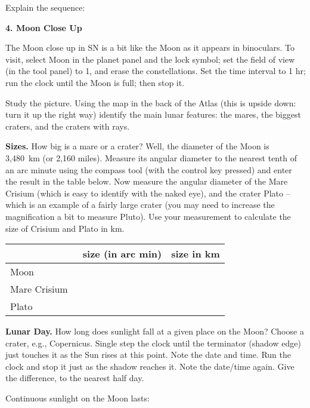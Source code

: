 \documentclass[12pt]{article}
\begin{document}
Explain the sequence: \makebox[12cm]{\hrulefill}

\bigskip
\bigskip
\noindent
{\bf 4. Moon Close Up} 

\medskip
\noindent
The Moon close up in SN is a bit like the Moon as it appears in
binoculars. To visit, select Moon in the planet panel and the lock
symbol; set the field of view (in the tool panel) to 1\deg, and erase
the constellations. Set the time interval to 1 hr;  run the clock
until the Moon is full; then stop it.

Study the picture. Using the map in the back of the Atlas (this
is upside down: turn it up the right way) identify the main lunar
features: the mares, the biggest craters, and the craters with rays.

\medskip
\noindent
{\bf Sizes.}
How big is a mare or a crater? Well, the diameter of the Moon is
3,480~km (or 2,160 miles). Measure its angular diameter to the nearest
tenth of an arc minute using the compass tool (with the control key
pressed) and enter the result in the table below. Now measure the
angular diameter of the Mare Crisium (which is easy to identify with
the naked eye), and the crater Plato -- which is an example of a
fairly large crater (you may need to increase the magnification a bit
to measure Pluto). Use your measurement to calculate the size of
Crisium and Plato in km.



\bigskip
\begin{center}
\begin{tabular}{lcc} \hline
     & \  size (in arc min) &\hspace{1.5cm} size in km  \\
 \hline
Moon           &  &       \\ \hline
Mare Crisium   &  &       \\ \hline
Plato          &  &       \\ \hline
\end{tabular}
\end{center}

\medskip
\noindent
{\bf Lunar Day.} How long does sunlight fall at a given place on the
Moon? Choose a crater, e.g., Copernicus. Single step the clock until
the terminator (shadow edge) just touches it as the Sun rises at this
point.  Note the date and time. Run the clock and stop it just as the
shadow reaches it. Note the date/time again. Give the difference, to
the nearest half day.

\medskip
Continuous sunlight on the Moon lasts: \makebox[4cm]{\hrulefill}
\end{document}
